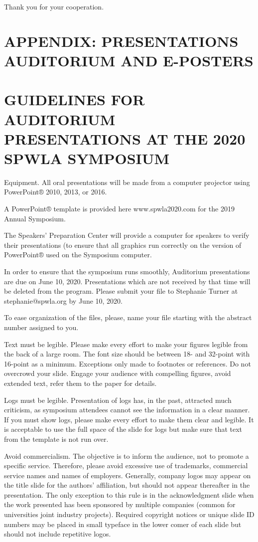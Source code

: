 \documentclass[10pt,twocolumn,twoside]{article}
\begin{document}
Thank you for your cooperation.

\section{APPENDIX: PRESENTATIONS AUDITORIUM AND E-POSTERS}

\section{GUIDELINES FOR AUDITORIUM PRESENTATIONS AT THE 2020 SPWLA SYMPOSIUM}

Equipment. All oral presentations will be made from a computer projector using PowerPoint® 2010, 2013, or 2016. 

A PowerPoint® template is provided here www.spwla2020.com  for the 2019 Annual Symposium. 

The Speakers' Preparation Center will provide a computer for speakers to verify their presentations (to ensure that all graphics run correctly on the version of PowerPoint® used on the Symposium computer.  

In order to ensure that the symposium runs smoothly, Auditorium presentations are due on June 10, 2020. Presentations which are not received by that time will be deleted from the program. Please submit your file to Stephanie Turner at stephanie@spwla.org by June 10, 2020. 

To ease organization of the files, please, name your file starting with the abstract number assigned to you.

Text must be legible. Please make every effort to make your figures legible from the back of a large room. The font size should be between 18- and 32-point with 16-point as a minimum. Exceptions only made to footnotes or references. Do not overcrowd your slide. Engage your audience with compelling figures, avoid extended text, refer them to the paper for details.

Logs must be legible. Presentation of logs has, in the past, attracted much criticism, as symposium attendees cannot see the information in a clear manner. If you must show logs, please make every effort to make them clear and legible. It is acceptable to use the full space of the slide for logs but make sure that text from the template is not run over.

Avoid commercialism. The objective is to inform the audience, not to promote a specific service. Therefore, please avoid excessive use of trademarks, commercial service names and names of employers. Generally, company logos may appear on the title slide for the authors' affiliation, but should not appear thereafter in the presentation. The only exception to this rule is in the acknowledgment slide when the work presented has been sponsored by multiple companies (common for universities joint industry projects). Required copyright notices or unique slide ID numbers may be placed in small typeface in the lower comer of each slide but should not include repetitive logos.
\end{document}
